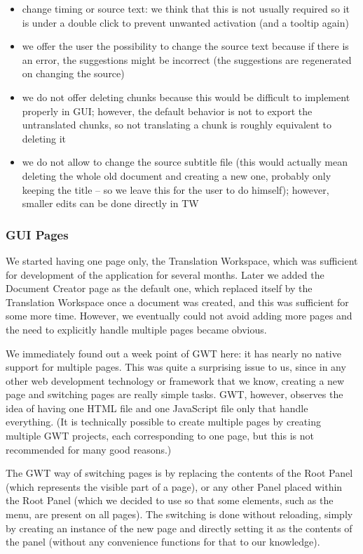 {\begin{itemize}
\item change timing or source text: we think that this is not usually required so it is under a double click to prevent unwanted activation (and a tooltip again)

\item we offer the user the possibility to change the source text because if there is an error, the suggestions might be incorrect (the suggestions are regenerated on changing the source)

\item we do not offer deleting chunks because this would be difficult to implement properly in GUI; however, the default behavior is not to export the untranslated chunks, so not translating a chunk is roughly equivalent to deleting it

\item we do not allow to change the source subtitle file (this would actually mean deleting the whole old document and creating a new one, probably only keeping the title -- so we leave this for the user to do himself); however, smaller edits can be done directly in TW
\end{itemize}

\subsubsection{GUI Pages}

We started having one page only, the Translation Workspace, which was sufficient for development of the application for several months. Later we added the Document  Creator page as the default one, which replaced itself by the Translation Workspace once a document was created, and this was sufficient for some more time. However, we eventually could not avoid adding more pages and the need to explicitly handle multiple pages became obvious.

We immediately found out a week point of GWT here: it has nearly no native support for multiple pages. This was quite a surprising issue to us, since in any other web development technology or framework that we know, creating a new page and switching pages are really simple tasks. GWT, however, observes the idea of having one HTML file and one JavaScript file only that handle everything. (It is technically possible to create multiple pages by creating multiple GWT projects, each corresponding to one page, but this is not recommended for many good reasons.)

The GWT way of switching pages is by replacing the contents of the Root Panel (which represents the visible part of a page), or any other Panel placed within the Root Panel (which we decided to use so that some elements, such as the menu, are present on all pages). The switching is done without reloading, simply by creating an instance of the new page and directly setting it as the contents of the panel (without any convenience functions for that to our knowledge).

}
